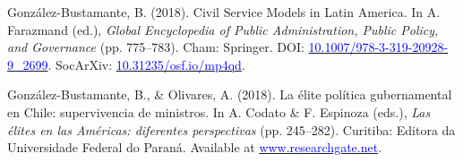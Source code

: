 \begin{publications}

\begin{benumerate}{12}

\item{González-Bustamante, B. (2018). Civil Service Models in Latin America. In A. Farazmand (ed.), {\itshape Global Encyclopedia of Public Administration, Public Policy, and Governance} (pp. 775--783). Cham: Springer. DOI: \href{https://doi.org/10.1007/978-3-319-20928-9\_2699}{\textcolor{blue}{10.1007/978-3-319-20928-9\_2699}}. SocArXiv: \href{https://doi.org/10.31235/osf.io/mp4qd}{\textcolor{blue}{10.31235/osf.io/mp4qd}}.}\vspace{1mm}


\item{González-Bustamante, B., \& Olivares, A. (2018). La élite política gubernamental en Chile: supervivencia de ministros. In A. Codato \& F. Espinoza (eds.), {\itshape Las élites en las Américas: diferentes perspectivas} (pp. 245--282). Curitiba: Editora da Universidade Federal do Paraná. Available at \href{https://www.researchgate.net/publication/325699783_Elites_en_las_Americas_diferentes_perspectivas_Elites_in_the_Americas_Different_Perspectives}{\textcolor{blue}{www.researchgate.net}}.}\vspace{1mm}



\end{benumerate}
\end{publications}
